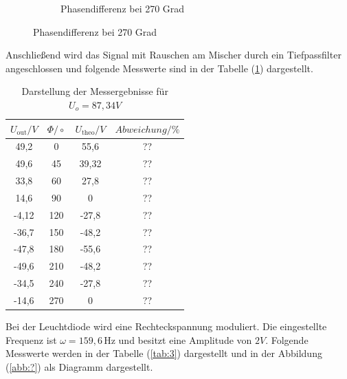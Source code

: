 \begin{figure}[H]
\begin{subfigure}{0.48\textwidth}
  \caption{Phasendifferenz bei 270 Grad}
\end{subfigure}
\end{figure}

Anschließend wird das Signal mit Rauschen am Mischer durch ein Tiefpassfilter angeschlossen und folgende
Messwerte sind in der Tabelle (\ref{tab:2}) dargestellt.
\begin{table}[H]
\centering
\caption{Darstellung der Messergebnisse für $U_o =87,34 V$}
\label{tab:2}
 \begin{tabular}{c c c c}
  \toprule
     $U_\text{out} / V$ & $\Phi/\circ$ & $U_\text{theo} / V$ & $Abweichung / \%$ \\
  \midrule
  49,2  & 0   & 55,6  &??\\
  49,6  & 45  & 39,32 &??\\
  33,8  & 60  & 27,8  &??\\
  14,6  & 90  &   0   &??\\
  -4,12 & 120 &-27,8  &??\\
  -36,7 & 150 &-48,2  &??\\
  -47,8 & 180 &-55,6  &??\\
  -49,6 & 210 &-48,2  &??\\
  -34,5 & 240 &-27,8  &??\\
  -14,6 & 270 &   0   &??\\
  \bottomrule
\end{tabular}
\end{table}


Bei der Leuchtdiode wird eine Rechteckspannung moduliert. Die eingestellte Frequenz ist $\omega = 159,6 \, \si{\hertz}$ und
besitzt eine Amplitude von $2 V$.
Folgende Messwerte werden in der Tabelle (\ref{tab:3}) dargestellt und in der Abbildung (\ref{abb:?}) als
Diagramm dargestellt.

